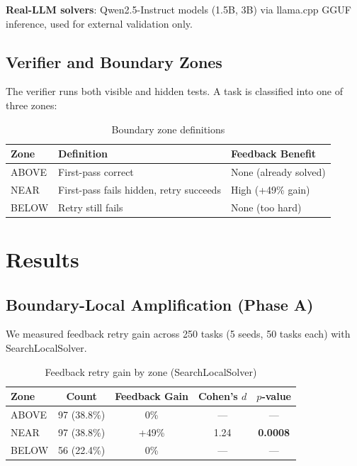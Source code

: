 \documentclass[11pt,a4paper]{article}
\begin{document}
\textbf{Real-LLM solvers}: Qwen2.5-Instruct models (1.5B, 3B) via llama.cpp GGUF inference, used for external validation only.

\subsection{Verifier and Boundary Zones}

The verifier runs both visible and hidden tests. A task is classified into one of three zones:

\begin{table}[h]
\centering
\begin{tabular}{lll}
\toprule
\textbf{Zone} & \textbf{Definition} & \textbf{Feedback Benefit} \\
\midrule
ABOVE & First-pass correct & None (already solved) \\
NEAR & First-pass fails hidden, retry succeeds & High (+49\% gain) \\
BELOW & Retry still fails & None (too hard) \\
\bottomrule
\end{tabular}
\caption{Boundary zone definitions}
\label{tab:zones}
\end{table}

\section{Results}

\subsection{Boundary-Local Amplification (Phase A)}

We measured feedback retry gain across 250 tasks (5 seeds, 50 tasks each) with SearchLocalSolver.

\begin{table}[h]
\centering
\begin{tabular}{lcccc}
\toprule
\textbf{Zone} & \textbf{Count} & \textbf{Feedback Gain} & \textbf{Cohen's $d$} & \textbf{$p$-value} \\
\midrule
ABOVE & 97 (38.8\%) & 0\% & --- & --- \\
NEAR & 97 (38.8\%) & +49\% & 1.24 & \textbf{0.0008} \\
BELOW & 56 (22.4\%) & 0\% & --- & --- \\
\bottomrule
\end{tabular}
\caption{Feedback retry gain by zone (SearchLocalSolver)}
\label{tab:phase_a}
\end{table}
\end{document}
